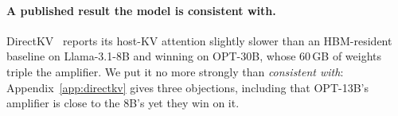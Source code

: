 \paragraph{A published result the model is consistent with.}
\label{sec:model:directkv}
DirectKV~\cite{directkv} reports its host-KV attention slightly slower than an
HBM-resident baseline on Llama-3.1-8B and winning on OPT-30B, whose 60\,GB of
weights triple the amplifier. We put it no more strongly than \emph{consistent
with}: Appendix~\ref{app:directkv} gives three objections, including that OPT-13B's
amplifier is close to the 8B's yet they win on it.
